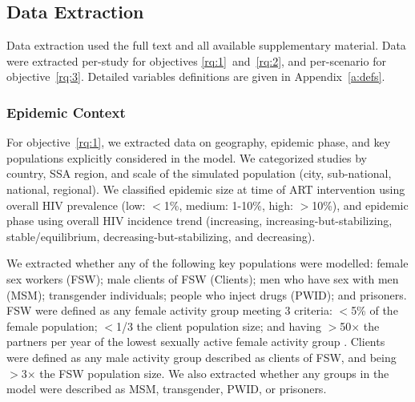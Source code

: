 \subsection{Data Extraction}
\label{ss:meth:data}
Data extraction used the full text and all available supplementary material.
Data were extracted per-study for objectives \ref{rq:1}~and~\ref{rq:2}, and
per-scenario for objective~\ref{rq:3}.
Detailed variables definitions are given in Appendix~\ref{a:defs}.
\subsubsection{Epidemic Context}
\label{sss:meth:context}
For objective~\ref{rq:1}, we extracted data on
geography, epidemic phase, and key populations explicitly considered in the model.
We categorized studies by country, SSA region, and
scale of the simulated population (city, sub-national, national, regional).
We classified epidemic size at time of ART intervention using
overall HIV prevalence (low: $<$1\%, medium: 1-10\%, high: $>$10\%),
and epidemic phase using overall HIV incidence trend
(increasing, increasing-but-stabilizing, stable/equilibrium, decreasing-but-stabilizing, and decreasing).
\par
We extracted whether any of the following key populations were modelled:
female sex workers (FSW);
male clients of FSW (Clients);
men who have sex with men (MSM);
transgender individuals;
people who inject drugs (PWID); and
prisoners.
FSW were defined as any female activity group meeting 3 criteria:
{$<$5\%} of the female population;
{$<$1/3} the client population size; and
having {$>$50$\times$} the partners per year of
the lowest sexually active female activity group \cite{Vandepitte2006,Scorgie2012}.
Clients were defined as any male activity group
described as clients of FSW, and being {$>$3$\times$} the FSW population size.
We also extracted whether any groups in the model were described as MSM, transgender, PWID, or prisoners.
